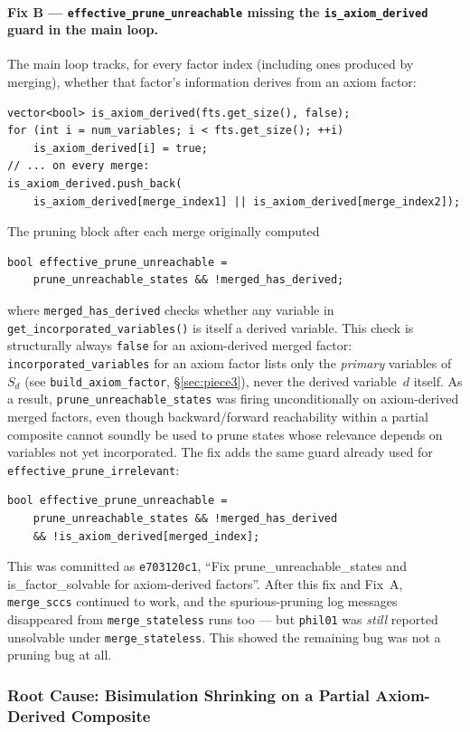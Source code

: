 \documentclass[11pt,a4paper]{article}
\begin{document}
\paragraph{Fix B --- \texttt{effective\_prune\_unreachable} missing the
\texttt{is\_axiom\_derived} guard in the main loop.}
The main loop tracks, for every factor index (including ones produced by
merging), whether that factor's information derives from an axiom factor:
\begin{lstlisting}
vector<bool> is_axiom_derived(fts.get_size(), false);
for (int i = num_variables; i < fts.get_size(); ++i)
    is_axiom_derived[i] = true;
// ... on every merge:
is_axiom_derived.push_back(
    is_axiom_derived[merge_index1] || is_axiom_derived[merge_index2]);
\end{lstlisting}
The pruning block after each merge originally computed
\begin{lstlisting}
bool effective_prune_unreachable =
    prune_unreachable_states && !merged_has_derived;
\end{lstlisting}
where \texttt{merged\_has\_derived} checks whether any variable in
\texttt{get\_incorporated\_variables()} is itself a derived variable. This
check is structurally always \texttt{false} for an axiom-derived merged
factor: \texttt{incorporated\_variables} for an axiom factor lists only the
\emph{primary} variables of $S_d$ (see \texttt{build\_axiom\_factor},
\S\ref{sec:piece3}), never the derived variable~$d$ itself. As a result,
\texttt{prune\_unreachable\_states} was firing unconditionally on
axiom-derived merged factors, even though backward/forward reachability
within a partial composite cannot soundly be used to prune states whose
relevance depends on variables not yet incorporated. The fix adds the same
guard already used for \texttt{effective\_prune\_irrelevant}:
\begin{lstlisting}
bool effective_prune_unreachable =
    prune_unreachable_states && !merged_has_derived
    && !is_axiom_derived[merged_index];
\end{lstlisting}
This was committed as \texttt{e703120c1}, ``Fix prune\_unreachable\_states and
is\_factor\_solvable for axiom-derived factors''. After this fix and Fix~A,
\texttt{merge\_sccs} continued to work, and the spurious-pruning log messages
disappeared from \texttt{merge\_stateless} runs too --- but \texttt{phil01}
was \emph{still} reported unsolvable under \texttt{merge\_stateless}. This
showed the remaining bug was not a pruning bug at all.

\subsubsection{Root Cause: Bisimulation Shrinking on a Partial Axiom-Derived Composite}
\label{sec:rootcause}
\end{document}
